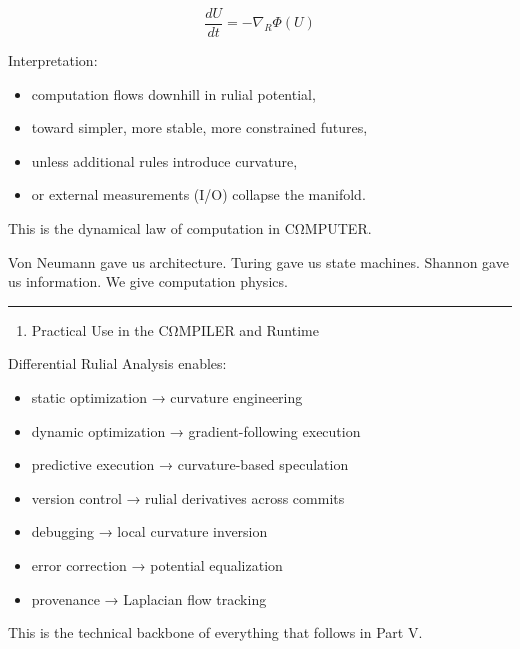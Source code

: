 \[
\frac{dU}{dt} = -\nabla_R \Phi(U)
\]

Interpretation:
\begin{itemize}[nosep]
  \item computation flows downhill in rulial potential,
  \item toward simpler, more stable, more constrained futures,
  \item unless additional rules introduce curvature,
  \item or external measurements (I/O) collapse the manifold.
\end{itemize}

This is the dynamical law of computation in CΩMPUTER.

Von Neumann gave us architecture. Turing gave us state machines. Shannon
gave us information. We give computation physics.

\begin{center}\rule{0.5\linewidth}{0.5pt}\end{center}

\begin{enumerate}
\def\labelenumi{\arabic{enumi}.}
\setcounter{enumi}{8}
\tightlist
\item
  Practical Use in the CΩMPILER and Runtime
\end{enumerate}

Differential Rulial Analysis enables:
\begin{itemize}[nosep]
  \item static optimization → curvature engineering
  \item dynamic optimization → gradient-following execution
  \item predictive execution → curvature-based speculation
  \item version control → rulial derivatives across commits
  \item debugging → local curvature inversion
  \item error correction → potential equalization
  \item provenance → Laplacian flow tracking
\end{itemize}

This is the technical backbone of everything that follows in Part V.
